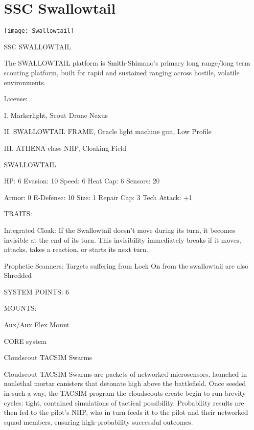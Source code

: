 \section{SSC Swallowtail}

\centering\texttt{[image: Swallowtail]}


                                          SSC SWALLOWTAIL

The SWALLOWTAIL platform is Smith-Shimano’s primary long range/long term scouting platform,
built for rapid and sustained ranging across hostile, volatile environments.

                                                     License:





I. Markerlight, Scout Drone Nexus

II. SWALLOWTAIL FRAME,  Oracle light machine gun, Low Profile

III. ATHENA-class NHP, Cloaking Field


                                                SWALLOWTAIL

  HP: 6           Evasion: 10                            Speed: 6            Heat Cap: 6         Sensors: 20

  Armor: 0        E-Defense: 10                          Size: 1             Repair Cap: 3       Tech Attack:
                                                                                                 +1

                                                      TRAITS:

  Integrated Cloak: If the Swallowtail doesn’t move during its turn, it becomes invisible at the end of its
  turn. This invisibility immediately breaks if it moves, attacks, takes a reaction, or starts its next turn.

  Prophetic Scanners: Targets suffering from Lock On from the swallowtail are also Shredded

                                               SYSTEM POINTS: 6

                                                     MOUNTS:

  Aux/Aux                                                 Flex Mount

                                                   CORE system

                                          Cloudscout TACSIM Swarms

  Cloudscout TACSIM Swarms are packets of networked microsensors, launched in nonlethal mortar
  canisters that detonate high above the battlefield. Once seeded in such a way, the TACSIM program the
  cloudscouts create begin to run brevity cycles: tight, contained simulations of tactical possibility.
  Probability results are then fed to the pilot’s NHP, who in turn feeds it to the pilot and their networked
  squad members, ensuring high-probability successful outcomes.

